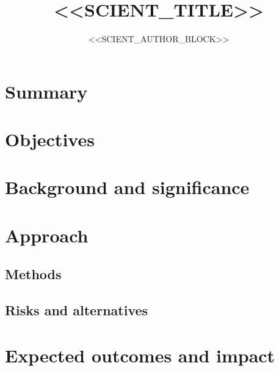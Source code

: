 \documentclass[11pt,a4paper]{article}
\title{<<SCIENT_TITLE>>}
\author{<<SCIENT_AUTHOR_BLOCK>>}
\date{}
\begin{document}
\maketitle

\section*{Summary}
\par

\section{Objectives}
\par

\section{Background and significance}
\par

\section{Approach}

\subsection{Methods}
\par

\subsection{Risks and alternatives}
\par

\section{Expected outcomes and impact}
\par
\end{document}
